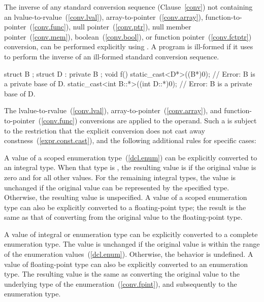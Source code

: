 \pnum
The inverse of any standard conversion sequence (Clause~\ref{conv}) not containing an
lvalue-to-rvalue~(\ref{conv.lval}),
array-to-pointer~(\ref{conv.array}),
function-to-pointer~(\ref{conv.func}),
null pointer~(\ref{conv.ptr}), null member pointer~(\ref{conv.mem}),
boolean~(\ref{conv.bool}), or
function pointer~(\ref{conv.fctptr})
conversion, can be performed explicitly using . A
program is ill-formed if it uses  to perform the
inverse of an ill-formed standard conversion sequence.
\begin{example}
\begin{codeblock}
struct B { };
struct D : private B { };
void f() {
  static_cast<D*>((B*)0);               // Error: B is a private base of D.
  static_cast<int B::*>((int D::*)0);   // Error: B is a private base of D.
}
\end{codeblock}
\end{example}

\pnum
The lvalue-to-rvalue~(\ref{conv.lval}),
array-to-pointer~(\ref{conv.array}), and
function-to-pointer~(\ref{conv.func}) conversions are applied to the
operand. Such a  is subject to the restriction that
the explicit conversion does not cast away
constness~(\ref{expr.const.cast}), and the following additional rules
for specific cases:

\pnum
A value of a scoped enumeration type~(\ref{dcl.enum}) can be explicitly converted to an
integral type. When that type is \cv{} , the resulting value is
 if the original value is zero and  for all other
values. For the remaining integral types, the value is unchanged if the
original value can be represented by the
specified type. Otherwise, the resulting value is unspecified.
A value of a scoped enumeration type can also be explicitly converted to a
floating-point type; the result is the same as that of converting from the original
value to the floating-point type.

\pnum
{}%
%
A value of integral or enumeration type can be explicitly converted to
a complete enumeration type. The value is unchanged if the original value is
within the range of the enumeration values~(\ref{dcl.enum}). Otherwise,
the behavior is undefined.
A value of floating-point type can also be explicitly converted to an enumeration type.
The resulting value is the same as converting the original value to the
underlying type of the enumeration~(\ref{conv.fpint}), and subsequently to
the enumeration type.

